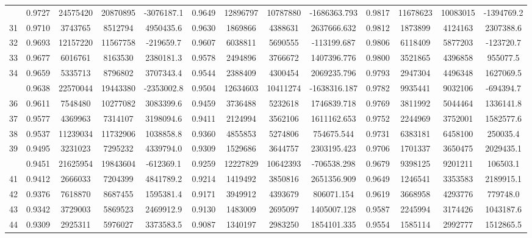 \documentclass[
  12pt,
]{article}
\begin{document}
\begin{longtable}[t]{lcccccccccccc}
\addlinespace
30 & 0.9727 & 24575420 & 20870895 & -3076187.1 & 0.9649 & 12896797 & 10787880 & -1686363.793 & 0.9817 & 11678623 & 10083015 & -1394769.2\\
31 & 0.9710 & 3743765 & 8512794 & 4950435.6 & 0.9630 & 1869866 & 4388631 & 2637666.632 & 0.9812 & 1873899 & 4124163 & 2307388.6\\
32 & 0.9693 & 12157220 & 11567758 & -219659.7 & 0.9607 & 6038811 & 5690555 & -113199.687 & 0.9806 & 6118409 & 5877203 & -123720.7\\
33 & 0.9677 & 6016761 & 8163530 & 2380181.3 & 0.9578 & 2494896 & 3766672 & 1407396.776 & 0.9800 & 3521865 & 4396858 & 955077.5\\
34 & 0.9659 & 5335713 & 8796802 & 3707343.4 & 0.9544 & 2388409 & 4300454 & 2069235.796 & 0.9793 & 2947304 & 4496348 & 1627069.5\\
\addlinespace
35 & 0.9638 & 22570044 & 19443380 & -2353002.8 & 0.9504 & 12634603 & 10411274 & -1638316.187 & 0.9782 & 9935441 & 9032106 & -694394.7\\
36 & 0.9611 & 7548480 & 10277082 & 3083399.6 & 0.9459 & 3736488 & 5232618 & 1746839.718 & 0.9769 & 3811992 & 5044464 & 1336141.8\\
37 & 0.9577 & 4369963 & 7314107 & 3198094.6 & 0.9411 & 2124994 & 3562106 & 1611162.653 & 0.9752 & 2244969 & 3752001 & 1582577.6\\
38 & 0.9537 & 11239034 & 11732906 & 1038858.8 & 0.9360 & 4855853 & 5274806 & 754675.544 & 0.9731 & 6383181 & 6458100 & 250035.4\\
39 & 0.9495 & 3231023 & 7295232 & 4339794.0 & 0.9309 & 1529686 & 3644757 & 2303195.423 & 0.9706 & 1701337 & 3650475 & 2029435.1\\
\addlinespace
40 & 0.9451 & 21625954 & 19843604 & -612369.1 & 0.9259 & 12227829 & 10642393 & -706538.298 & 0.9679 & 9398125 & 9201211 & 106503.1\\
41 & 0.9412 & 2666033 & 7204399 & 4841789.2 & 0.9214 & 1419492 & 3850816 & 2651356.909 & 0.9649 & 1246541 & 3353583 & 2189915.1\\
42 & 0.9376 & 7618870 & 8687455 & 1595381.4 & 0.9171 & 3949912 & 4393679 & 806071.154 & 0.9619 & 3668958 & 4293776 & 779748.0\\
43 & 0.9342 & 3729003 & 5869523 & 2469912.9 & 0.9130 & 1483009 & 2695097 & 1405007.128 & 0.9587 & 2245994 & 3174426 & 1043187.6\\
44 & 0.9309 & 2925311 & 5976027 & 3373583.5 & 0.9087 & 1340197 & 2983250 & 1854101.335 & 0.9554 & 1585114 & 2992777 & 1512865.5\\

\end{longtable}
\end{document}
